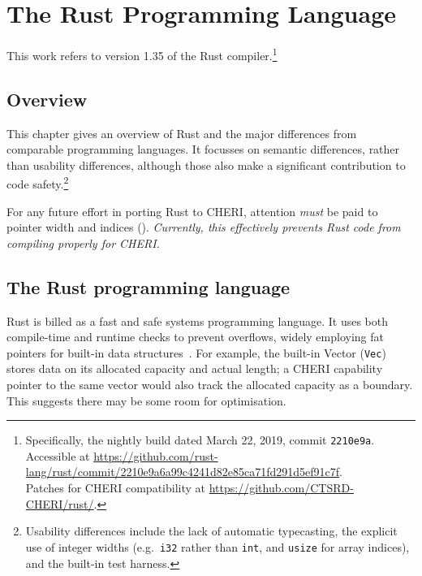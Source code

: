 \documentclass[dissertation.tex]{subfiles}
\begin{document}
\chapter{The Rust Programming Language}
\label{ch:rust}

This work refers to version 1.35 of the Rust
compiler.\footnote{Specifically, the nightly build dated March 22, 2019,
commit \texttt{2210e9a}. \\ Accessible at
\url{https://github.com/rust-lang/rust/commit/2210e9a6a99c4241d82e85ca71fd291d5ef91c7f}.
\\ Patches for CHERI compatibility at \url{https://github.com/CTSRD-CHERI/rust/}.}


\section{Overview}
This chapter gives an overview of Rust and the major differences from
comparable programming languages.
It focusses on semantic differences, rather than usability differences,
although those also make a significant contribution to code
safety.\footnote{Usability differences include the lack of automatic
typecasting, the explicit use of integer widths (e.g.\ \texttt{i32}
rather than \texttt{int}, and \texttt{usize} for array indices), and the
built-in test harness.}

For any future effort in porting Rust to CHERI, attention \emph{must} be
paid to pointer width and indices ().
\emph{Currently, this effectively prevents Rust code from compiling
properly for CHERI.}



\section{The Rust programming language}
Rust is billed as a fast and safe systems programming language.
It uses both compile-time and runtime checks to prevent overflows,
widely employing fat pointers for built-in data
structures~\cite{blandy-orendorff}.
For example, the built-in Vector (\texttt{Vec}) stores data on its
allocated capacity and actual length; a CHERI capability pointer to the
same vector would also track the allocated capacity as a boundary.
This suggests there may be some room for optimisation.


\end{document}
